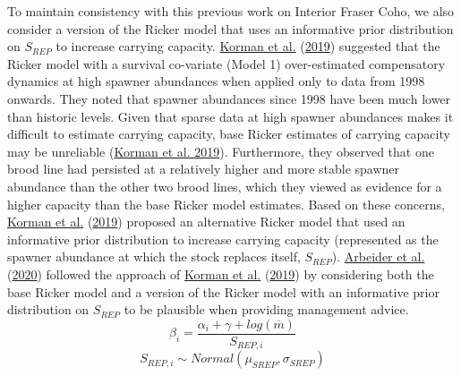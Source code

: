 \documentclass[11pt]{book}
\begin{document}
To maintain consistency with this previous work on Interior Fraser Coho, we also consider a version of the Ricker model that uses an informative prior distribution on \(S_{REP}\) to increase carrying capacity. \protect\hyperlink{ref-kormanEvaluationFrameworkAssessing2019}{Korman et al.} (\protect\hyperlink{ref-kormanEvaluationFrameworkAssessing2019}{2019}) suggested that the Ricker model with a survival co-variate (Model 1) over-estimated compensatory dynamics at high spawner abundances when applied only to data from 1998 onwards. They noted that spawner abundances since 1998 have been much lower than historic levels. Given that sparse data at high spawner abundances makes it difficult to estimate carrying capacity, base Ricker estimates of carrying capacity may be unreliable (\protect\hyperlink{ref-kormanEvaluationFrameworkAssessing2019}{Korman et al. 2019}). Furthermore, they observed that one brood line had persisted at a relatively higher and more stable spawner abundance than the other two brood lines, which they viewed as evidence for a higher capacity than the base Ricker model estimates. Based on these concerns, \protect\hyperlink{ref-kormanEvaluationFrameworkAssessing2019}{Korman et al.} (\protect\hyperlink{ref-kormanEvaluationFrameworkAssessing2019}{2019}) proposed an alternative Ricker model that used an informative prior distribution to increase carrying capacity (represented as the spawner abundance at which the stock replaces itself, \(S_{REP}\)). \protect\hyperlink{ref-arbeiderInteriorFraserCoho2020}{Arbeider et al.} (\protect\hyperlink{ref-arbeiderInteriorFraserCoho2020}{2020}) followed the approach of \protect\hyperlink{ref-kormanEvaluationFrameworkAssessing2019}{Korman et al.} (\protect\hyperlink{ref-kormanEvaluationFrameworkAssessing2019}{2019}) by considering both the base Ricker model and a version of the Ricker model with an informative prior distribution on \(S_{REP}\) to be plausible when providing management advice.
\begin{equation}
  \beta_i = \frac{\alpha_i + \gamma + log(\overline{m})}{S_{REP,i}}
   \label{eq:beta-Srep}
\end{equation} \begin{equation}
  S_{REP,i} \sim Normal(\mu_{SREP},\sigma_{SREP})
\end{equation}
\end{document}
